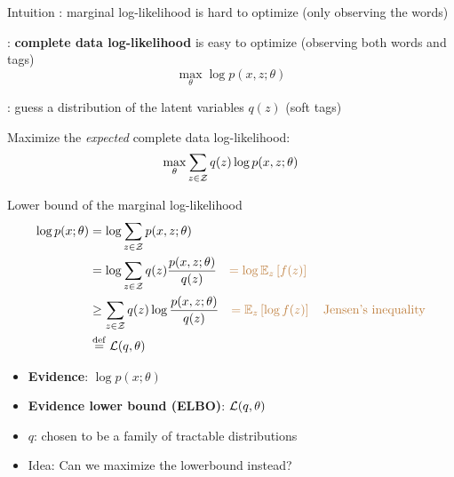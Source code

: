 \documentclass[usenames,dvipsnames,notes,11pt,aspectratio=169]{beamer}
\newcommand{\pdfnote}[1]{}
\begin{document}
\begin{frame}
    {Intuition}
    : marginal log-likelihood is hard to optimize (only observing the words)

    : \textbf{complete data log-likelihood} is easy to optimize (observing both words and tags)
    $$
    \max_\theta \log p(x,z;\theta)
    $$

    : guess a distribution of the latent variables $q(z)$ (soft tags)

    Maximize the \emph{expected} complete data log-likelihood:
    $$
    \max_\theta \sum_{z\in\mathcal{Z}} q(z) \log p(x,z;\theta)
    $$

\end{frame}

\begin{frame}
    {Lower bound of the marginal log-likelihood}
    \begin{align*}
        \log p(x;\theta) &= \log \sum_{z\in\mathcal{Z}} p(x,z;\theta) \\
        &= \log \sum_{z\in\mathcal{Z}} q(z) \frac{p(x,z;\theta)}{q(z)}
        \quad {\color{brown}= \log \ensuremath{\mathbb{E}}_z\ensuremath{\left[ f(z) \right]}}\\
        &\ge \sum_{z\in\mathcal{Z}} q(z) \log \frac{p(x,z;\theta)}{q(z)}
        \quad {\color{brown}= \ensuremath{\mathbb{E}}_z\ensuremath{\left[ \log f(z) \right]} \quad\text{Jensen's inequality}} \\
        &\stackrel{\rm def}{=} \mathcal{L}(q, \theta)
    \end{align*}
    \vspace{-2em}
    \begin{itemize}
        \item \textbf{Evidence}:  $\log p(x;\theta)$
        \item \textbf{Evidence lower bound (ELBO)}: $\mathcal{L}(q, \theta)$
        \item $q$: chosen to be a family of tractable distributions
        \item Idea: Can we maximize the lowerbound instead?
    \end{itemize}
    \pdfnote{But we have to be careful what's the gap between this lowerbound and our objective. Draw loose lowerbound.}
\end{frame}
\end{document}
